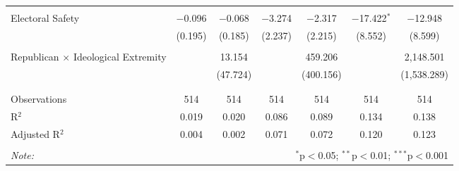 \begin{tabular}{@{\extracolsep{5pt}}lcccccc}
  & & & & & & \\ 
 Electoral Safety & $-$0.096 & $-$0.068 & $-$3.274 & $-$2.317 & $-$17.422$^{*}$ & $-$12.948 \\ 
  & (0.195) & (0.185) & (2.237) & (2.215) & (8.552) & (8.599) \\ 
  & & & & & & \\ 
 Republican $\times$ Ideological Extremity &  & 13.154 &  & 459.206 &  & 2,148.501 \\ 
  &  & (47.724) &  & (400.156) &  & (1,538.289) \\ 
  & & & & & & \\ 
\hline \\[-1.8ex] 
Observations & 514 & 514 & 514 & 514 & 514 & 514 \\ 
R$^{2}$ & 0.019 & 0.020 & 0.086 & 0.089 & 0.134 & 0.138 \\ 
Adjusted R$^{2}$ & 0.004 & 0.002 & 0.071 & 0.072 & 0.120 & 0.123 \\ 
\hline 
\hline \\[-1.8ex] 
\textit{Note:}  & \multicolumn{6}{r}{$^{*}$p$<$0.05; $^{**}$p$<$0.01; $^{***}$p$<$0.001} \\ 
\end{tabular} 
